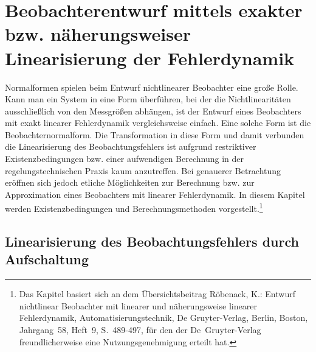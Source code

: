 
\chapter[Beobachterentwurf mittels  Linearisierung der Fehlerdynamik]{Beobachterentwurf mittels exakter bzw. näherungsweiser Linearisierung
der Fehlerdynamik\label{cha:Beobachter-Normalform}}

Normalformen spielen beim Entwurf nichtlinearer Beobachter eine große
Rolle. Kann man ein System in eine Form überführen, bei der die Nichtlinearitäten
ausschließlich von den Messgrößen abhängen, ist der Entwurf eines
Beobachters mit exakt linearer Fehlerdynamik vergleichsweise einfach.
Eine solche Form ist die Beobachternormalform. Die Transformation
in diese Form und damit verbunden die Linearisierung des Beobachtungsfehlers
ist aufgrund restriktiver Existenzbedingungen bzw. einer aufwendigen
Berechnung in der regelungstechnischen Praxis kaum anzutreffen. Bei
genauerer Betrachtung eröffnen sich jedoch etliche Möglichkeiten zur
Berechnung bzw. zur Approximation eines Beobachters mit linearer Fehlerdynamik.
In diesem Kapitel werden Existenzbedingungen und Berechnungsmethoden
vorgestellt.\footnote{Das Kapitel basiert sich an dem Übersichtsbeitrag Röbenack, K.: Entwurf
nichtlinear Beobachter mit linearer und näherungsweise linearer Fehlerdynamik,
Automatisierungstechnik, De Gruyter-Verlag, Berlin, Boston, Jahrgang~58,
Heft~9, S.~489-497, für den der De~Gruyter-Verlag freundlicherweise
eine Nutzungsgenehmigung erteilt hat.}

\section{Linearisierung des Beobachtungsfehlers durch Aufschaltung\label{sec:Linearisierung-durch-Aufschaltung}}

